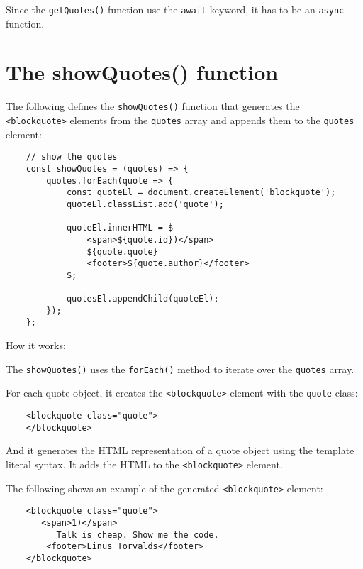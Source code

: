 \documentclass[11pt]{article}
\begin{document}
\noindent
Since the \verb|getQuotes()| function use the \verb|await| keyword, it has to be
an \verb|async| function.

\section*{The showQuotes() function}

The following defines the \verb|showQuotes()| function that generates
the \verb|<blockquote>| elements from the \verb|quotes| array and appends them
to the \verb|quotes| element:

\begin{lstlisting}
    // show the quotes
    const showQuotes = (quotes) => {
        quotes.forEach(quote => {
            const quoteEl = document.createElement('blockquote');
            quoteEl.classList.add('quote');

            quoteEl.innerHTML = $
                <span>${quote.id})</span>
                ${quote.quote}
                <footer>${quote.author}</footer>
            $;

            quotesEl.appendChild(quoteEl);
        });
    };
\end{lstlisting}

\noindent
How it works:
\newline

\noindent
The \verb|showQuotes()| uses the \verb|forEach()| method to iterate over
the \verb|quotes| array.
\newline

\noindent
For each quote object, it creates the \verb|<blockquote>| element with
the \verb|quote| class:

\begin{lstlisting}
    <blockquote class="quote">
    </blockquote>
\end{lstlisting}

\noindent
And it generates the HTML representation of a quote object using
the template literal syntax. It adds the HTML to the \verb|<blockquote>| element.
\newline

\noindent
The following shows an example of the generated \verb|<blockquote>| element:

\begin{lstlisting}
    <blockquote class="quote">
       <span>1)</span>
          Talk is cheap. Show me the code.
        <footer>Linus Torvalds</footer>
    </blockquote>
\end{lstlisting}
\end{document}
